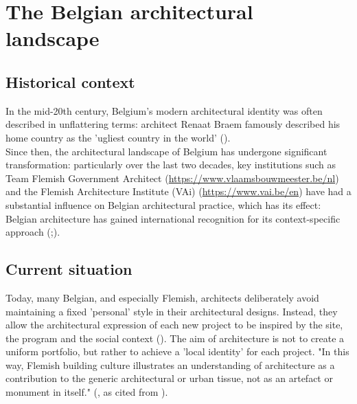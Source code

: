 
\section{The Belgian architectural landscape}

\subsection{Historical context}
In the mid-20th century, Belgium's modern architectural identity was often described in unflattering terms: architect Renaat Braem famously described his home country as the 'ugliest country in the world' (\cite{braem_het_1968}).\\
Since then, the architectural landscape of Belgium has undergone significant transformation: particularly over the last two decades, key institutions such as Team Flemish Government Architect (\url{https://www.vlaamsbouwmeester.be/nl}) and the Flemish Architecture Institute (VAi) (\url{https://www.vai.be/en}) have had a substantial influence on Belgian architectural practice, which has its effect: Belgian architecture has gained international recognition for its context-specific approach (\cite{wainwright_flanders_2022};\cite{antonissen_continuity_2022}).

\subsection{Current situation}
Today, many Belgian, and especially Flemish, architects deliberately avoid maintaining a fixed 'personal' style in their architectural designs. Instead, they allow the architectural expression of each new project to be inspired by the site, the program and the social context (\cite{de_caigny_flanders_2024}). The aim of architecture is not to create a uniform portfolio, but rather to achieve a 'local identity' for each project. "In this way, Flemish building culture illustrates an understanding of architecture as a contribution to the generic architectural or urban tissue, not as an artefact or monument in itself." (\cite{antonissen_continuity_2022}, as cited from  \cite{avermaete_rereading_2016}).
